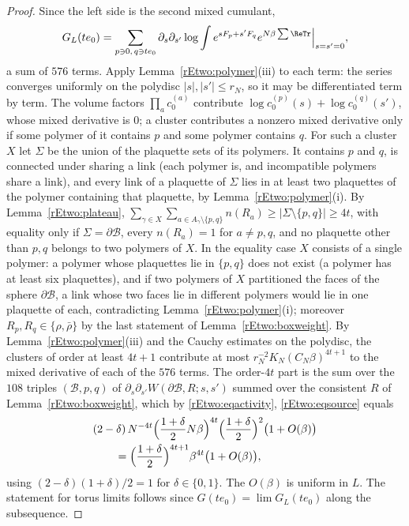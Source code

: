 \begin{proof}
Since the left side is the second mixed cumulant,
\[
G_L(te_0)=\sum_{p\ni0,\,q\ni te_0}\partial_s\partial_{s'}\log\int e^{sF_p
+s'F_q}e^{N\beta\sum\ReTr}\Big|_{s=s'=0},
\]
a sum of $576$ terms. Apply Lemma~\ref{rEtwo:polymer}(iii) to each term:
the series converges uniformly on the polydisc $|s|,|s'|\le r_N$, so it
may be differentiated term by term. The volume factors $\prod_ac^{(a)}_0$
contribute $\log c^{(p)}_0(s)+\log c^{(q)}_0(s')$, whose mixed derivative
is $0$; a cluster contributes a nonzero mixed derivative only if some
polymer of it contains $p$ and some polymer contains $q$. For such a
cluster $X$ let $\Sigma$ be the union of the plaquette sets of its
polymers. It contains $p$ and $q$, is connected under sharing a link (each
polymer is, and incompatible polymers share a link), and every link of a
plaquette of $\Sigma$ lies in at least two plaquettes of the polymer
containing that plaquette, by Lemma~\ref{rEtwo:polymer}(i). By
Lemma~\ref{rEtwo:plateau}, $\sum_{\gamma\in X}\sum_{a\in A_\gamma\setminus
\{p,q\}}n(R_a)\ge|\Sigma\setminus\{p,q\}|\ge4t$, with equality only if
$\Sigma=\partial\mathcal B$, every $n(R_a)=1$ for $a\ne p,q$, and no
plaquette other than $p,q$ belongs to two polymers of $X$. In the equality
case $X$ consists of a single polymer: a polymer whose plaquettes lie in
$\{p,q\}$ does not exist (a polymer has at
least six plaquettes), and if two polymers of $X$ partitioned the faces of
the sphere $\partial\mathcal B$, a link whose two faces lie in different
polymers would lie in one plaquette of each, contradicting
Lemma~\ref{rEtwo:polymer}(i); moreover $R_p,R_q\in\{\rho,\bar\rho\}$ by the
last statement of Lemma~\ref{rEtwo:boxweight}. By
Lemma~\ref{rEtwo:polymer}(iii) and the Cauchy estimates on the polydisc,
the clusters of order at least $4t+1$ contribute at most $r_N^{-2}K_N(C_N
\beta)^{4t+1}$ to the mixed derivative of each of the $576$ terms. The
order-$4t$ part is the sum over the $108$ triples $(\mathcal B,p,q)$ of
$\partial_s\partial_{s'}W(\partial\mathcal B,R;s,s')$ summed over the
consistent $R$ of Lemma~\ref{rEtwo:boxweight}, which by
\eqref{rEtwo:eqactivity}, \eqref{rEtwo:eqsource} equals
\begin{align*}
&(2-\delta)\,N^{-4t}\Bigl(\frac{1+\delta}2N\beta\Bigr)^{4t}\Bigl(\frac{1+
\delta}2\Bigr)^2\bigl(1+O(\beta)\bigr)\\
&\qquad=\Bigl(\frac{1+\delta}2\Bigr)^{4t+1}\beta^{4t}\bigl(1+O(\beta)\bigr),
\end{align*}
using $(2-\delta)(1+\delta)/2=1$ for $\delta\in\{0,1\}$. The $O(\beta)$ is
uniform in $L$. The statement for torus limits follows since $G(te_0)=
\lim G_L(te_0)$ along the subsequence.
\end{proof}

